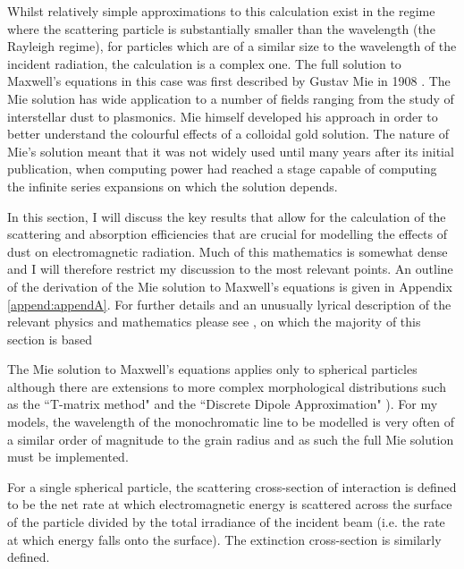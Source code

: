 Whilst relatively simple approximations to this calculation exist in the regime where the scattering particle is substantially smaller than the wavelength (the Rayleigh regime), for particles which are of a similar size to the wavelength of the incident radiation, the calculation is a complex one.  The full solution to Maxwell's equations in this case was first described by Gustav Mie in 1908 \citep{Mie1908}.  The Mie solution has wide application to a number of fields ranging from the study of interstellar dust to plasmonics.  Mie himself developed his approach in order to better understand the colourful effects of a colloidal gold solution.  The nature of Mie's solution meant that it was not widely used until many years after its initial publication, when computing power had reached a stage capable of computing the infinite series expansions on which the solution depends.

In this section, I will discuss the key results that allow for the calculation of the scattering and absorption efficiencies that are crucial for modelling the effects of dust on electromagnetic radiation.  Much of this mathematics is somewhat dense and I will therefore restrict my discussion to the most relevant points. An outline of the derivation of the Mie solution to Maxwell's equations is given in Appendix \ref{append:appendA}.  For further details and an unusually lyrical description of the relevant physics and mathematics please see \citet{Bohren1983}, on which the majority of this section is based

The Mie solution to Maxwell's equations applies only to spherical particles although there are extensions to more complex morphological distributions such as the ``T-matrix method" and the ``Discrete Dipole Approximation" \citep{Mishchenko2002,Draine2004}).  For my models, the wavelength of the monochromatic line to be modelled is very often of a similar order of magnitude to the grain radius and as such the full Mie solution must be implemented.  %

For a single spherical particle, the scattering cross-section of interaction is defined to be the net rate at which electromagnetic energy is scattered across the surface of the particle divided by the total irradiance of the incident beam (i.e. the rate at which energy falls onto the surface).  The extinction cross-section is similarly defined.  

